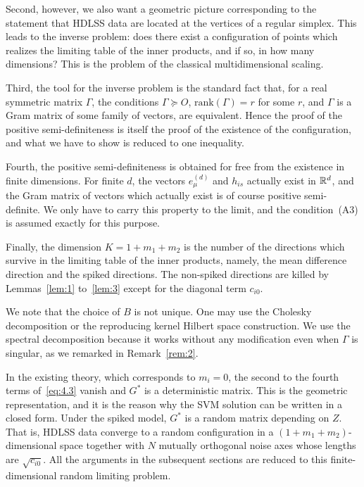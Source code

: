 Second, however, we also want a geometric picture corresponding to the statement
that HDLSS data are located at the vertices of a regular simplex. This leads to
the inverse problem: does there exist a configuration of points which realizes the
limiting table of the inner products, and if so, in how many dimensions? This is
the problem of the classical multidimensional scaling.

Third, the tool for the inverse problem is the standard fact that, for a real
symmetric matrix $\Gamma$, the conditions $\Gamma\succeq O$, $\mathrm{rank}(\Gamma)=r$
for some $r$, and $\Gamma$ is a Gram matrix of some family of vectors, are
equivalent. Hence the proof of the positive semi-definiteness is itself the proof
of the existence of the configuration, and what we have to show is reduced to one
inequality.

Fourth, the positive semi-definiteness is obtained for free from the existence in
finite dimensions. For finite $d$, the vectors $e_\mu^{(d)}$ and $h_{is}$ actually
exist in $\mathbb{R}^d$, and the Gram matrix of vectors which actually exist is of course
positive semi-definite. We only have to carry this property to the limit, and the
condition~(A3) is assumed exactly for this purpose.

Finally, the dimension $K=1+m_1+m_2$ is the number of the directions which survive
in the limiting table of the inner products, namely, the mean difference direction
and the spiked directions. The non-spiked directions are killed by
Lemmas~\ref{lem:1} to~\ref{lem:3} except for the diagonal term $c_{i0}$.

We note that the choice of $B$ is not unique. One may use the Cholesky
decomposition or the reproducing kernel Hilbert space construction. We use the
spectral decomposition because it works without any modification even when $\Gamma$
is singular, as we remarked in Remark~\ref{rem:2}.

\begin{remark}
\label{rem:4}
In the existing theory, which corresponds to $m_i=0$, the second to the fourth
terms of~\eqref{eq:4.3} vanish and $G^*$ is a deterministic matrix. This is the
geometric representation, and it is the reason why the SVM solution can be written
in a closed form. Under the spiked model, $G^*$ is a random matrix depending on
$Z$. That is, HDLSS data converge to a random configuration in a
$(1+m_1+m_2)$-dimensional space together with $N$ mutually orthogonal noise axes
whose lengths are $\sqrt{c_{i0}}$. All the arguments in the subsequent sections are
reduced to this finite-dimensional random limiting problem.
\end{remark}
